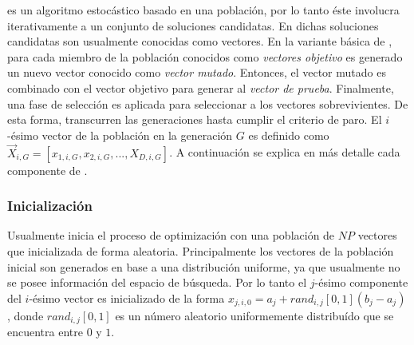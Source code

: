 \DE{} es un algoritmo estocástico basado en una población, por lo tanto éste involucra iterativamente a un conjunto de soluciones candidatas.
%
En \DE{} dichas soluciones candidatas son usualmente conocidas como vectores.
%
En la variante básica de \DE{}, para cada miembro de la población conocidos como \textit{vectores objetivo} es generado un nuevo vector conocido como \textit{vector mutado}.
%
Entonces, el vector mutado es combinado con el vector objetivo para generar al \textit{vector de prueba}.
%
Finalmente, una fase de selección es aplicada para seleccionar a los vectores sobrevivientes.
%
De esta forma, transcurren las generaciones hasta cumplir el criterio de paro.
%
El $i$-ésimo vector de la población en la generación $G$ es definido como$\vec{X}_{i,G} = [x_{1,i,G}, x_{2,i,G},..., X_{D,i, G}]$.
%
A continuación se explica en más detalle cada componente de \DE{}.


\subsubsection{Inicialización}

Usualmente \DE{} inicia el proceso de optimización con una población de $NP$ vectores que inicializada de forma aleatoria.
%
Principalmente los vectores de la población inicial son generados en base a una distribución uniforme, ya que usualmente no se posee información del espacio de búsqueda.
%
Por lo tanto el $j$-ésimo componente del $i$-ésimo vector es inicializado de la forma $x_{j,i,0} = a_{j} + rand_{i,j}[0,1] (b_{j} - a_{j})$,
donde $rand_{i,j}[0,1]$ es un número aleatorio uniformemente distribuído que se encuentra entre $0$ y $1$.

